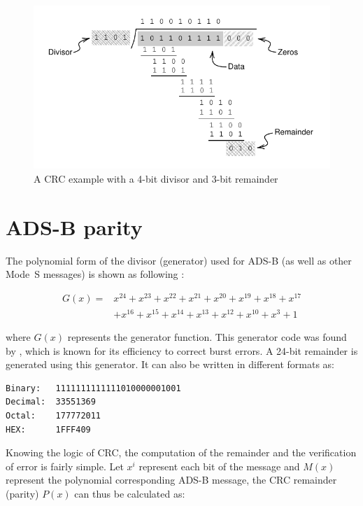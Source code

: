 \begin{figure}[ht]
  \includegraphics[scale=0.9]{figures/crc/crc_example.pdf}
  \caption{A CRC example with a 4-bit divisor and 3-bit remainder}
  \label{fig:crc_example}
\end{figure}


\section{ADS-B parity}

The polynomial form of the divisor (generator) used for ADS-B (as well as other Mode~S messages) is shown as following \cite{gertz1984}:

\begin{equation}
  \begin{split}
  G(x) = &x^{24}+x^{23}+x^{22}+x^{21}+x^{20}+x^{19}+x^{18}+x^{17} \\
         &+x^{16}+x^{15}+x^{14}+x^{13}+x^{12}+x^{10}+x^{3}+1
  \end{split}
\end{equation}

where $G(x)$ represents the generator function. This generator code was found by \cite{kasami1964}, which is known for its efficiency to correct burst errors. A 24-bit remainder is generated using this generator. It can also be written in different formats as:

\begin{verbatim}
Binary:   1111111111111010000001001
Decimal:  33551369
Octal:    177772011
HEX:      1FFF409
\end{verbatim}

Knowing the logic of CRC, the computation of the remainder and the verification of error is fairly simple. Let  $x^{i}$ represent each bit of the message and $M(x)$ represent the polynomial corresponding ADS-B message, the CRC remainder (parity) $P(x)$ can thus be calculated as:

